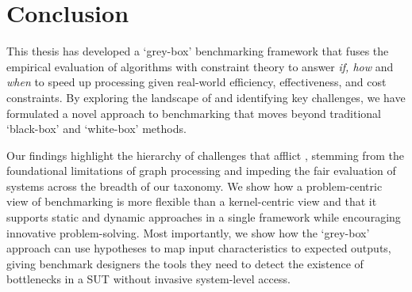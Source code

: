 \section{Conclusion}
\label{section:62-Conclusion}




\acresetall

This thesis has developed a `grey-box' \gai benchmarking framework that fuses the empirical evaluation of algorithms with constraint theory to answer \textit{if, how} and \textit{when} to speed up \gai processing given real-world efficiency, effectiveness, and cost constraints. 
By exploring the landscape of \gai and identifying key challenges, we have formulated a novel approach to benchmarking that moves beyond traditional `black-box' and `white-box' methods. 

Our findings highlight the hierarchy of challenges that afflict \gai, stemming from the foundational limitations of graph processing and impeding the fair evaluation of systems across the breadth of our \gai taxonomy.
We show how a problem-centric view of benchmarking is more flexible than a kernel-centric view and that it supports static and dynamic approaches in a single framework while encouraging innovative problem-solving. 
Most importantly, we show how the `grey-box' approach can use hypotheses to map input characteristics to expected outputs, giving benchmark designers the tools they need to detect the existence of bottlenecks in a \ac{SUT} without invasive system-level access.

